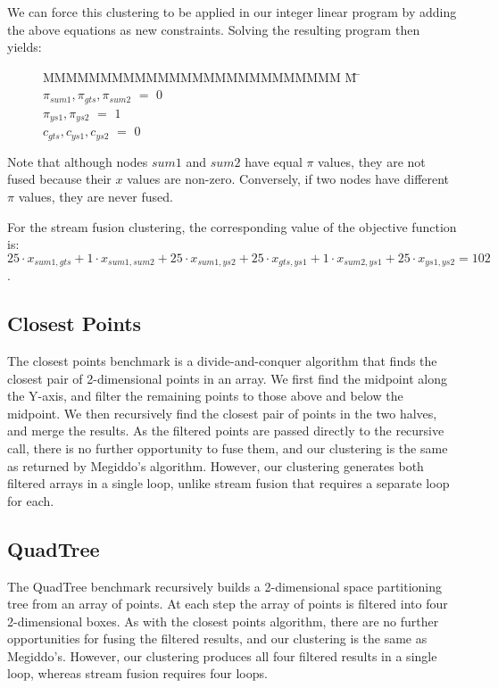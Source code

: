 We can force this clustering to be applied in our integer linear program by adding the above equations as new constraints.
Solving the resulting program then yields:

\begin{figure}[h!]
\begin{tabbing}
MMMMMMMMMMMMMMMMMMMMMMMMMM \= M \= \kill
$\pi_{sum1}, \pi_{gts }, \pi_{sum2}$
    \> $=$ \> $0$ \\
$\pi_{ys1 }, \pi_{ys2 }$
    \> $=$ \> $1$ \\
$c_{gts}, c_{ys1}, c_{ys2}$           
    \> $=$ \> $0$
\end{tabbing}
\end{figure}
Note that although nodes $sum1$ and $sum2$ have equal $\pi$ values, they are not fused because their $x$ values are non-zero.
Conversely, if two nodes have different $\pi$ values, they are never fused. 

For the stream fusion clustering, the corresponding value of the objective function is: \\
$25 \cdot x_{sum1, gts} + 1 \cdot x_{sum1,sum2} + 25 \cdot x_{sum1, ys2} + 25 \cdot x_{gts, ys1} + 1 \cdot x_{sum2, ys1} + 25 \cdot x_{ys1, ys2} = 102$. 


\subsection{Closest Points}
The closest points benchmark is a divide-and-conquer algorithm that finds the closest pair of 2-dimensional points in an array. We first find the midpoint along the Y-axis, and filter the remaining points to those above and below the midpoint. We then recursively find the closest pair of points in the two halves, and merge the results. As the filtered points are passed directly to the recursive call, there is no further opportunity to fuse them, and our clustering is the same as returned by Megiddo's algorithm. However, our clustering generates both filtered arrays in a single loop, unlike stream fusion that requires a separate loop for each.


\subsection{QuadTree}
The QuadTree benchmark recursively builds a 2-dimensional space partitioning tree from an array of points. At each step the array of points is filtered into four 2-dimensional boxes. As with the closest points algorithm, there are no further opportunities for fusing the filtered results, and our clustering is the same as Megiddo's. However, our clustering produces all four filtered results in a single loop, whereas stream fusion requires four loops.


